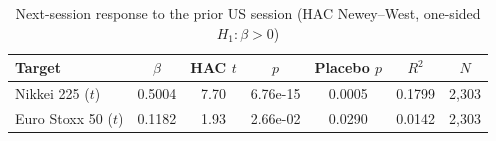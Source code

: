 \begin{table}[H]
\centering
\caption{Next-session response to the prior US session (HAC Newey--West, one-sided $H_1:\beta>0$)}
\label{tab:spillover}
\begin{tabular}{lcccccc}
\toprule
Target & $\beta$ & HAC $t$ & $p$ & Placebo $p$ & $R^2$ & $N$ \\
\midrule
Nikkei 225 ($t$) & 0.5004 & 7.70 & 6.76e-15 & 0.0005 & 0.1799 & 2,303 \\
Euro Stoxx 50 ($t$) & 0.1182 & 1.93 & 2.66e-02 & 0.0290 & 0.0142 & 2,303 \\
\bottomrule
\end{tabular}
\end{table}
